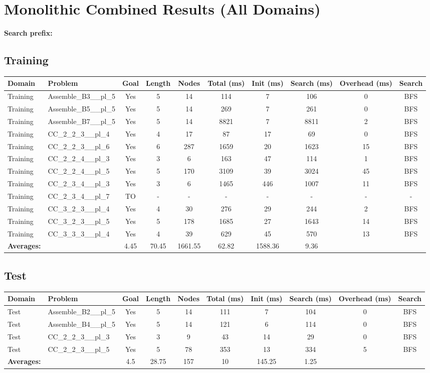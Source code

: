 \documentclass{article}
\begin{document}
\section*{Monolithic Combined Results (All Domains)}
\textbf{Search prefix:} 
\\[0.5cm]
\subsection*{Training}
\begin{tabular}{llcccccccc}
\toprule
Domain & Problem & Goal & Length & Nodes & Total (ms) & Init (ms) & Search (ms) & Overhead (ms) & Search \\
\midrule
Training & Assemble\_B3\_\_pl\_5 & Yes & 5 & 14 & 114 & 7 & 106 & 0 & BFS \\
Training & Assemble\_B5\_\_pl\_5 & Yes & 5 & 14 & 269 & 7 & 261 & 0 & BFS \\
Training & Assemble\_B7\_\_pl\_5 & Yes & 5 & 14 & 8821 & 7 & 8811 & 2 & BFS \\
Training & CC\_2\_2\_3\_\_pl\_4 & Yes & 4 & 17 & 87 & 17 & 69 & 0 & BFS \\
Training & CC\_2\_2\_3\_\_pl\_6 & Yes & 6 & 287 & 1659 & 20 & 1623 & 15 & BFS \\
Training & CC\_2\_2\_4\_\_pl\_3 & Yes & 3 & 6 & 163 & 47 & 114 & 1 & BFS \\
Training & CC\_2\_2\_4\_\_pl\_5 & Yes & 5 & 170 & 3109 & 39 & 3024 & 45 & BFS \\
Training & CC\_2\_3\_4\_\_pl\_3 & Yes & 3 & 6 & 1465 & 446 & 1007 & 11 & BFS \\
Training & CC\_2\_3\_4\_\_pl\_7 & TO & - & - & - & - & - & - & - \\
Training & CC\_3\_2\_3\_\_pl\_4 & Yes & 4 & 30 & 276 & 29 & 244 & 2 & BFS \\
Training & CC\_3\_2\_3\_\_pl\_5 & Yes & 5 & 178 & 1685 & 27 & 1643 & 14 & BFS \\
Training & CC\_3\_3\_3\_\_pl\_4 & Yes & 4 & 39 & 629 & 45 & 570 & 13 & BFS \\
\textbf{Averages:} & & 4.45 & 70.45 & 1661.55 & 62.82 & 1588.36 & 9.36 & \\
\bottomrule
\end{tabular}
\newpage
\subsection*{Test}
\begin{tabular}{llcccccccc}
\toprule
Domain & Problem & Goal & Length & Nodes & Total (ms) & Init (ms) & Search (ms) & Overhead (ms) & Search \\
\midrule
Test & Assemble\_B2\_\_pl\_5 & Yes & 5 & 14 & 111 & 7 & 104 & 0 & BFS \\
Test & Assemble\_B4\_\_pl\_5 & Yes & 5 & 14 & 121 & 6 & 114 & 0 & BFS \\
Test & CC\_2\_2\_3\_\_pl\_3 & Yes & 3 & 9 & 43 & 14 & 29 & 0 & BFS \\
Test & CC\_2\_2\_3\_\_pl\_5 & Yes & 5 & 78 & 353 & 13 & 334 & 5 & BFS \\
\textbf{Averages:} & & 4.5 & 28.75 & 157 & 10 & 145.25 & 1.25 & \\
\bottomrule
\end{tabular}
\newpage
\end{document}
